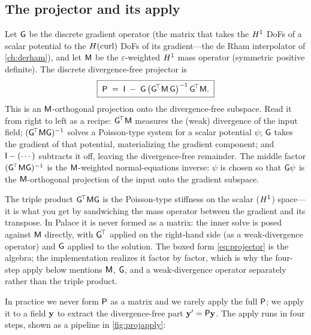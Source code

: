 \subsection{The projector and its apply}

Let $\mathsf{G}$ be the discrete gradient operator (the matrix that takes the
$H^1$ DoFs of a scalar potential to the $H(\mathrm{curl})$ DoFs of its gradient---the de
Rham interpolator of \cref{ch:derham}), and let $\mathsf{M}$ be the
$\varepsilon$-weighted $H^1$ mass operator (symmetric positive definite). The
discrete divergence-free projector is
\begin{equation}
  \boxed{\;
  \mathsf{P} \;=\; \mathsf{I} \;-\; \mathsf{G}\,\bigl(\mathsf{G}^{\!\top}\mathsf{M}\,\mathsf{G}\bigr)^{-1}\,\mathsf{G}^{\!\top}\mathsf{M}.
  \;}
  \label{eq:projector}
\end{equation}
This is an $\mathsf{M}$-orthogonal projection onto the divergence-free subspace. Read
it from right to left as a recipe: $\mathsf{G}^{\!\top}\mathsf{M}$ measures the (weak)
divergence of the input field; $(\mathsf{G}^{\!\top}\mathsf{M}\mathsf{G})^{-1}$ solves a
Poisson-type system for a scalar potential $\psi$; $\mathsf{G}$ takes the gradient of
that potential, materializing the gradient component; and $\mathsf{I}-(\cdots)$
subtracts it off, leaving the divergence-free remainder. The middle factor
$(\mathsf{G}^{\!\top}\mathsf{M}\mathsf{G})^{-1}$ is the $\mathsf{M}$-weighted normal-equations
inverse: $\psi$ is chosen so that $\mathsf{G}\psi$ is the $\mathsf{M}$-orthogonal
projection of the input onto the gradient subspace.

\begin{notationbox}
The triple product $\mathsf{G}^{\!\top}\mathsf{M}\mathsf{G}$ is the Poisson-type stiffness
on the scalar ($H^1$) space---it is what you get by sandwiching the mass
operator between the gradient and its transpose. In Palace it is never formed as a
matrix: the inner solve is posed against $\mathsf{M}$ directly, with $\mathsf{G}^{\!\top}$
applied on the right-hand side (as a weak-divergence operator) and $\mathsf{G}$
applied to the solution. The boxed form \cref{eq:projector} is the algebra; the
implementation realizes it factor by factor, which is why the four-step apply
below mentions $\mathsf{M}$, $\mathsf{G}$, and a weak-divergence operator separately
rather than the triple product.
\end{notationbox}

In practice we never form $\mathsf{P}$ as a matrix and we rarely apply the full
$\mathsf{P}$; we apply it to a field $\mathbf{y}$ to extract the divergence-free part
$\mathbf{y}'=\mathsf{P}\mathbf{y}$. The apply runs in four steps, shown as a pipeline in
\cref{fig:projapply}:

